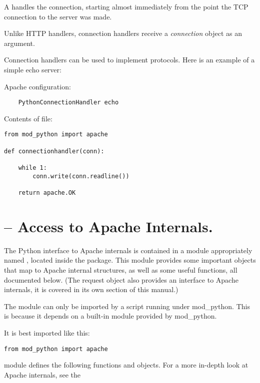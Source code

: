 A  handles the connection, starting almost
immediately from the point the TCP connection to the server was
made. 

Unlike HTTP handlers, connection handlers receive a \emph{connection}
object as an argument.

Connection handlers can be used to implement protocols. Here is an
example of a simple echo server:

Apache configuration:
\begin{verbatim}
    PythonConnectionHandler echo
\end{verbatim}

Contents of  file:

\begin{verbatim}
from mod_python import apache

def connectionhandler(conn):

    while 1:
        conn.write(conn.readline())

    return apache.OK
\end{verbatim}

\section{ -- Access to Apache Internals.}

The Python interface to Apache internals is contained in a module
appropriately named , located inside the
 package. This module provides some important
objects that map to Apache internal structures, as well as some useful
functions, all documented below. (The request object also provides an
interface to Apache internals, it is covered in its own section of
this manual.)

 The  module can only be
imported by a script running under mod_python. This is because it
depends on a built-in module  provided by
mod_python.

It is best imported like this:

\begin{verbatim}
from mod_python import apache
\end{verbatim}

 module defines the following functions and
objects. For a more in-depth look at Apache internals, see the

